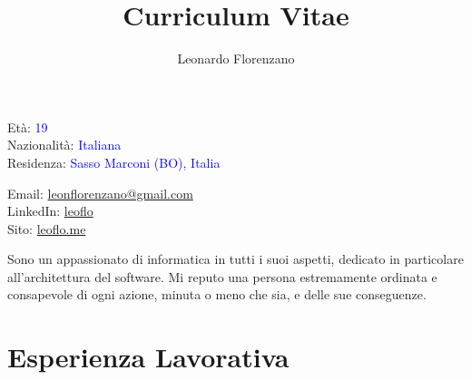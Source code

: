 \documentclass{paper}
\title{Curriculum Vitae}
\author{Leonardo Florenzano}
\begin{document}
\maketitle

\begin{multicols}{2}

\noindent
Età: \textcolor{blue}{19}\\
Nazionalità: \textcolor{blue}{Italiana}\\
Residenza: \textcolor{blue}{Sasso Marconi (BO), Italia}

\columnbreak

\noindent
Email: \href{mailto:leonflorenzano@gmail.com}{leonflorenzano@gmail.com}\\
LinkedIn: \href{https://www.linkedin.com/in/leoflo}{leoflo}\\
Sito: \href{https://leoflo.me}{leoflo.me}

\end{multicols}

\noindent
Sono un appassionato di informatica in tutti i suoi aspetti, dedicato in particolare all'architettura del software.
Mi reputo una persona estremamente ordinata e consapevole di ogni azione, minuta o meno che sia, e delle sue conseguenze.

\section{Esperienza Lavorativa}
\end{document}
